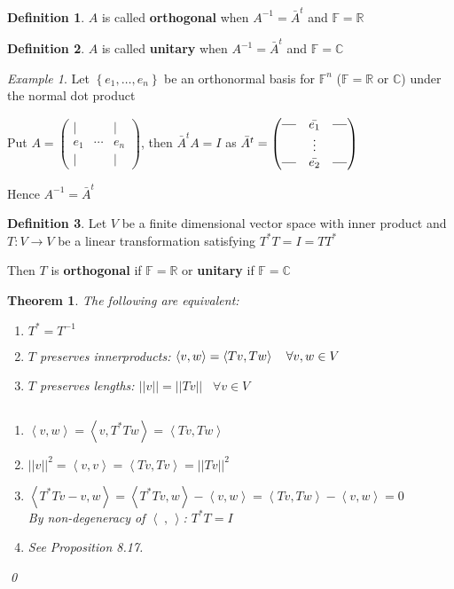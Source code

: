 \documentclass[11pt, a4paper]{report}
\makeatletter
\numberwithin{equation}{section}
\newcommand{\R}{\mathbb{R}}
\newcommand{\C}{\mathbb{C}}
\newcommand{\F}{\mathbb{F}}
\newcommand{\spn}[1]{\left\langle #1 \right\rangle}
\newcommand{\spb}{\spn{\;,\,}}
\newcommand{\sett}[1]{\left\lbrace #1 \right\rbrace}
\newcommand{\pmx}[1]{\begin{pmatrix}#1\end{pmatrix}}
\numberwithin{equation}{subsection}
\theoremstyle{plain}
\newtheorem{thm}{Theorem}[chapter] %
\theoremstyle{definition}
\newtheorem{defn}{Definition}[chapter]
\theoremstyle{remark}
\newtheorem{exmp}{Example}[chapter]
\newtheorem*{prf}{Proof}
\renewenvironment{prf}[1][\proofname]{\par
  \vspace{-\topsep}%
  \normalfont
  \topsep0pt \partopsep0pt %
  \trivlist
  \item[\hskip\labelsep
        \itshape
    #1\@addpunct{.}]\ignorespaces
}{%
  \popQED\endtrivlist\@endpefalse
  \addvspace{6pt plus 6pt} %
}
\newcommand{\pr}[1]{\begin{adjustwidth}{1cm}{} \begin{prf} #1 \end{prf} \end{adjustwidth}}
\makeatother
\begin{document}
\begin{defn} 
$A$ is called \textbf{orthogonal} when $A^{-1} = \bar{A}^t$ and $\F = \R$
\end{defn}

\begin{defn}
$A$ is called \textbf{unitary} when $A^{-1} = \bar{A}^t$ and $\F = \C$
\end{defn}

\begin{exmp}
Let $\sett{e_1, \ldots, e_n}$ be an orthonormal basis for $\F^n$ ($\F = \R$ or $\C$) under the normal dot product

Put $A = \pmx{| & & |\\e_1 & \cdots & e_n\\| & & |}$, then $\bar{A}^tA = I$ as $\bar{A}^t = \pmx{\text{\textbf{---}} & \bar{e_1} & \text{\textbf{---}}\\ & \vdots \\ \text{\textbf{---}} & \bar{e_2} & \text{\textbf{---}}}$

Hence $A^{-1} = \bar{A}^t$
\end{exmp}

\begin{defn}
Let $V$ be a finite dimensional vector space with inner product and $T: V \to V$ be a linear transformation satisfying $T^*T = I = TT^*$

Then $T$ is \textbf{orthogonal} if $\F = \R$ or \textbf{unitary} if $\F = \C$
\end{defn}

\newpage

\begin{thm}
The following are equivalent:
\begin{adjustwidth}{1cm}{}
\begin{enumerate}[(1) ]
\item $T^* = T^{-1}$
\item $T$ preserves innerproducts: $\spn{v,w} = \spn{Tv,Tw} \hspace*{10pt} \forall v,w \in V$
\item $T$ preserves lengths: $||v|| = ||Tv|| \hspace{10pt} \forall v \in V$
\end{enumerate}
\end{adjustwidth}
\pr{${}$
\begin{adjustwidth}{1.5cm}{}
\begin{enumerate}
\item[$(1) \Rightarrow (2)$ ] $\spn{v,w} = \spn{v, T^*Tw} = \spn{Tv, Tw}$\\
\item[$(2) \Rightarrow (3)$ ] $||v||^2 = \spn{v,v} = \spn{Tv,Tv} = ||Tv||^2$\\
\item[$(2) \Rightarrow (1)$ ] $\spn{T^*Tv - v,w} = \spn{T^*Tv, w} - \spn{v,w} = \spn{Tv,Tw} - \spn{v,w} = 0$\\ By non-degeneracy of $\spb$: $T^*T = I$\\
\item[$(3) \Rightarrow (2)$ ] See Proposition 8.17.
\end{enumerate}
\end{adjustwidth}
}\qed
\end{thm}
\end{document}
